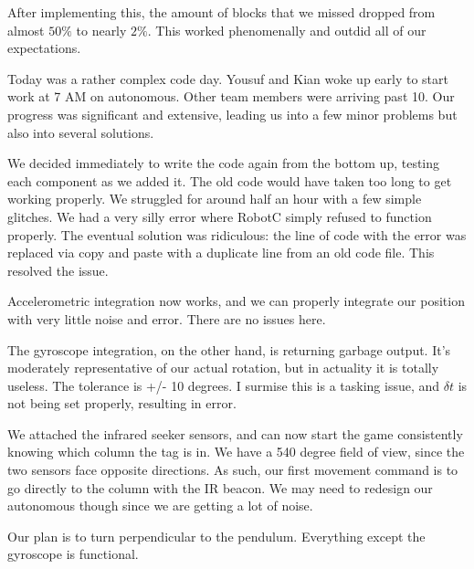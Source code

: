 After implementing this, the amount of blocks that we missed dropped from almost $50\%$ to nearly $2\%$. This worked phenomenally and outdid all of our expectations. 

Today was a rather complex code day. Yousuf and Kian woke up early to start work at 7 AM on autonomous. Other team members were arriving past 10. Our progress was significant and extensive, leading us into a few minor problems but also into several solutions. 

We decided immediately to write the code again from the bottom up, testing each component as we added it. The old code would have taken too long to get working properly. We struggled for around half an hour with a few simple glitches. We had a very silly error where RobotC simply refused to function properly. The eventual solution was ridiculous: the line of code with the error was replaced via copy and paste with a duplicate line from an old code file. This resolved the issue. 

Accelerometric integration now works, and we can properly integrate our position with very little noise and error. There are no issues here. 

The gyroscope integration, on the other hand, is returning garbage output. It's moderately representative of our actual rotation, but in actuality it is totally useless. The tolerance is +/- 10 degrees. I surmise this is a tasking issue, and $\delta t$ is not being set properly, resulting in error. 

We attached the infrared seeker sensors, and can now start the game consistently knowing which column the tag is in. We have a 540 degree field of view, since the two sensors face opposite directions. As such, our first movement command is to go directly to the column with the IR beacon. We may need to redesign our autonomous though since we are getting a lot of noise. 

Our plan is to turn perpendicular to the pendulum. Everything except the gyroscope is functional.

